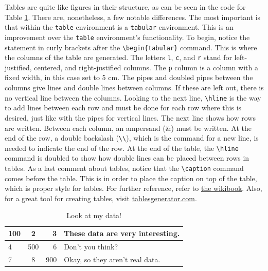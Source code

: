 \documentclass[english,12pt]{article}
\begin{document}
Tables are quite like figures in their structure, as can be seen in the code for Table \ref{mydataTable}. There are, nonetheless, a few notable differences. The most important is that within the \texttt{table} environment is a \texttt{tabular} environment. This is an improvement over the \texttt{table} environment's functionality. To begin, notice the statement in curly brackets after the \texttt{\textbackslash begin\{tabular\}} command. This is where the columns of the table are generated. The letters \texttt{l}, \texttt{c}, and \texttt{r} stand for left-justified, centered, and right-justified columns. The \texttt{p} column is a column with a fixed width, in this case set to 5 cm. The pipes and doubled pipes between the columns give lines and double lines between columns. If these are left out, there is no vertical line between the columns. Looking to the next line, \texttt{\textbackslash hline} is the way to add lines between each row and must be done for each row where this is desired, just like with the pipes for vertical lines. The next line shows how rows are written. Between each column, an ampersand (\&) must be written. At the end of the row, a double backslash (\texttt{\textbackslash \textbackslash}), which is the command for a new line, is needed to indicate the end of the row. At the end of the table, the \texttt{\textbackslash hline} command is doubled to show how double lines can be placed between rows in tables. As a last comment about tables, notice that the \texttt{\textbackslash caption} command comes before the table. This is in order to place the caption on top of the table, which is proper style for tables. For further reference, refer to \href{https://en.wikibooks.org/wiki/LaTeX/Tables}{the wikibook}. Also, for a great tool for creating tables, visit \href{www.tablesgenerator.com}{tablesgenerator.com}.

\begin{table}[H]
\centering
\caption{Look at my data!}
\label{mydataTable}
\begin{tabular}{|| l |c  r | p{5cm} ||}
\hline
	100 & 2 & 3 & These data are very interesting. \\    \hline
    4 & 500 & 6 & Don't you think? \\ \hline
    7 & 8 & 900 & Okay, so they aren't real data. \\
    \hline \hline
\end{tabular}
\end{table}
\end{document}
